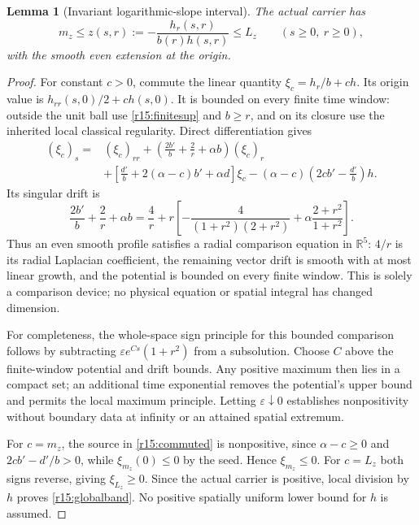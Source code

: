 \documentclass[11pt]{article}
\numberwithin{equation}{section}
\newtheorem{lemma}[theorem]{Lemma}
\begin{document}
\begin{lemma}[Invariant logarithmic-slope interval]\label{r15:invariantband}
The actual carrier has
\begin{equation}\label{r15:globalband}
 m_z\le z(s,r):=-\frac{h_r(s,r)}{b(r)h(s,r)}\le L_z
 \qquad(s\ge0,\ r\ge0),
\end{equation}
with the smooth even extension at the origin.
\end{lemma}
\begin{proof}
For constant $c>0$, commute the linear quantity
$\xi_c=h_r/b+ch$. Its origin value is $h_{rr}(s,0)/2+ch(s,0)$.
It is bounded on every finite time window: outside the unit ball use
\eqref{r15:finitesup} and $b\ge r$, and on its closure use the
inherited local classical regularity. Direct differentiation gives
\begin{equation}\label{r15:commuted}
 \begin{split}
 (\xi_c)_s={}&(\xi_c)_{rr}
 +\left(\frac{2b'}b+\frac2r+\alpha b\right)(\xi_c)_r\\
 &+\left[\frac{d'}b+2(\alpha-c)b'+\alpha d\right]\xi_c
 -(\alpha-c)\left(2cb'-\frac{d'}b\right)h.
 \end{split}
\end{equation}
Its singular drift is
\begin{equation}\label{r15:comparisonlift}
 \frac{2b'}b+\frac2r+\alpha b
 =\frac4r+r\left[-\frac4{(1+r^2)(2+r^2)}
                       +\alpha\frac{2+r^2}{1+r^2}\right].
\end{equation}
Thus an even smooth profile satisfies a radial comparison equation in
$\mathbb R^5$: $4/r$ is its radial Laplacian coefficient, the remaining
vector drift is smooth with at most linear growth, and the potential
is bounded on every finite window. This is solely a comparison device;
no physical equation or spatial integral has changed dimension.

For completeness, the whole-space sign principle for this bounded
comparison follows by subtracting
$\varepsilon e^{Cs}(1+r^2)$ from a subsolution. Choose $C$ above the
finite-window potential and drift bounds. Any positive maximum then
lies in a compact set; an additional time exponential removes the
potential's upper bound and permits the local maximum principle.
Letting $\varepsilon\downarrow0$ establishes nonpositivity without
boundary data at infinity or an attained spatial extremum.

For $c=m_z$, the source in \eqref{r15:commuted} is nonpositive, since
$\alpha-c\ge0$ and $2cb'-d'/b>0$, while $\xi_{m_z}(0)\le0$ by the seed.
Hence $\xi_{m_z}\le0$. For $c=L_z$ both signs reverse, giving
$\xi_{L_z}\ge0$. Since the actual carrier is positive, local division
by $h$ proves \eqref{r15:globalband}. No positive spatially uniform
lower bound for $h$ is assumed.
\end{proof}
\end{document}
